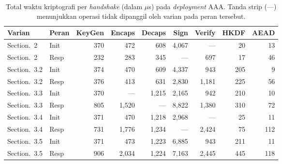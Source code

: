 \documentclass{easychair}
\newcommand{\VarSecShort}[1]{Section.~#1}
\begin{document}
\begin{table}[h]
\centering
\footnotesize
\caption{Total waktu kriptografi per \emph{handshake} (dalam $\mu$s)
pada \emph{deployment} AAA. Tanda strip (---) menunjukkan operasi
tidak dipanggil oleh varian pada peran tersebut.}
\label{tab:operations}
\begin{tabular}{llrrrrrrr}
\toprule
\textbf{Varian} & \textbf{Peran} & \textbf{KeyGen} & \textbf{Encaps} & \textbf{Decaps} & \textbf{Sign} & \textbf{Verify} & \textbf{HKDF} & \textbf{AEAD} \\
\midrule
\VarSecShort{2}   & Init & 370 &    472 &  608 & 4{,}067 & ---       &  20 &  13 \\
\VarSecShort{2}   & Resp & 232 &    283 &  345 & ---     &    697    &  17 &  46 \\
\VarSecShort{3.2} & Init & 374 &    470 &  609 & 4{,}337 &    943    & 205 &   9 \\
\VarSecShort{3.2} & Resp & 376 &    413 &  631 & 2{,}830 & 1{,}181   & 225 &  56 \\
\VarSecShort{3.3} & Init & 370 & ---    & 1{,}215 & 2{,}165 &    942 & 210 &  10 \\
\VarSecShort{3.3} & Resp & 805 & 1{,}520 & ---    & 8{,}822 & 1{,}380 & 310 &  72 \\
\VarSecShort{3.4} & Init & 371 &    470 & 1{,}218 & 2{,}968 & ---     &  25 &  11 \\
\VarSecShort{3.4} & Resp & 731 & 1{,}776 & 1{,}234 & ---     & 2{,}424 &  75 & 112 \\
\VarSecShort{3.5} & Init & 371 &    473 & 1{,}223 & 6{,}885 &    943  & 211 &  11 \\
\VarSecShort{3.5} & Resp & 906 & 2{,}034 & 1{,}224 & 7{,}163 & 2{,}445 & 445 & 118 \\
\bottomrule
\end{tabular}
\end{table}
\end{document}
